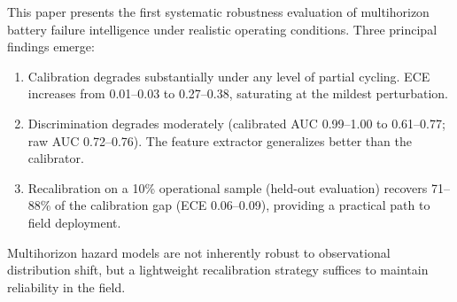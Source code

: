\documentclass[11pt,a4paper]{article}
\begin{document}
This paper presents the first systematic robustness evaluation of multihorizon battery failure intelligence under realistic operating conditions. Three principal findings emerge:

\begin{enumerate}
\item Calibration degrades substantially under any level of partial cycling. ECE increases from 0.01--0.03 to 0.27--0.38, saturating at the mildest perturbation.
 \item Discrimination degrades moderately (calibrated AUC 0.99--1.00 to 0.61--0.77; raw AUC 0.72--0.76). The feature extractor generalizes better than the calibrator.
 \item Recalibration on a 10\% operational sample (held-out evaluation) recovers 71--88\% of the calibration gap (ECE 0.06--0.09), providing a practical path to field deployment.
\end{enumerate}

Multihorizon hazard models are not inherently robust to observational distribution shift, but a lightweight recalibration strategy suffices to maintain reliability in the field.
\end{document}

